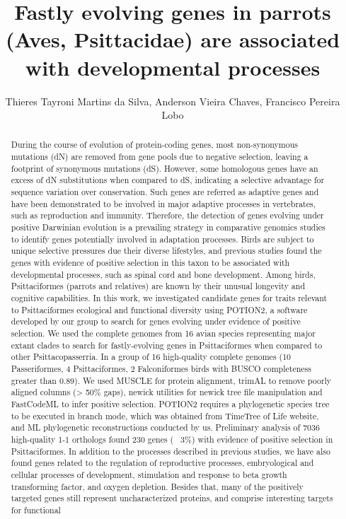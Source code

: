 \documentclass[twoside]{article}
\title{\vspace{-15mm}\fontsize{24pt}{10pt}\selectfont\textbf{ Fastly evolving genes in parrots (Aves,  Psittacidae) are associated with developmental processes }} %
\author{ Thieres Tayroni Martins da Silva, Anderson Vieira Chaves, Francisco Pereira Lobo }
\affil{ Universidade Federal de Minas Gerais }
\date{}
\begin{document}
  
  
  \maketitle %
  
  
  \thispagestyle{fancy} %
  
  
  \begin{abstract}
  During the course of evolution of protein-coding genes,  most non-synonymous mutations (dN) are removed from gene pools due to negative selection,  leaving a footprint of synonymous mutations (dS). However,  some homologous genes have an excess of dN substitutions when compared to dS,  indicating a selective advantage for sequence variation over conservation. Such genes are referred as adaptive genes and have been demonstrated to be involved in major adaptive processes in vertebrates,  such as reproduction and immunity. Therefore,  the detection of genes evolving under positive Darwinian evolution is a prevailing strategy in comparative genomics studies to identify genes potentially involved in adaptation processes. Birds are subject to unique selective pressures due their diverse lifestyles,  and previous studies found the genes with evidence of positive selection in this taxon to be associated with developmental processes,  such as spinal cord and bone development. Among birds,  Psittaciformes (parrots and relatives) are known by their unusual longevity and cognitive capabilities. In this work,  we investigated candidate genes for traits relevant to Psittaciformes ecological and functional diversity using POTION2,  a software developed by our group to search for genes evolving under evidence of positive selection. We used the complete genomes from 16 avian species representing major extant clades to search for fastly-evolving genes in Psittaciformes when compared to other Psittacopasserria. In a group of 16 high-quality complete genomes (10 Passeriformes,  4 Psittaciformes,  2 Falconiformes birds with BUSCO completeness greater than 0.89). We used MUSCLE for protein alignment,  trimAL to remove poorly aligned columns (> 50\% gaps),  newick utilities for newick tree file manipulation and FastCodeML to infer positive selection. POTION2 requires a phylogenetic species tree to be executed in branch mode,  which was obtained from TimeTree of Life website,  and ML phylogenetic reconstructions conducted by us. Preliminary analysis of 7036 high-quality 1-1 orthologs found 230 genes (~ 3\%) with evidence of positive selection in Psittaciformes. In addition to the processes described in previous studies,  we have also found genes related to the regulation of reproductive processes,  embryological and cellular processes of development,  stimulation and response to beta growth transforming factor,  and oxygen depletion. Besides that,  many of the positively targeted genes still represent uncharacterized proteins,  and comprise interesting targets for functional 
\end{abstract}
\end{document}
